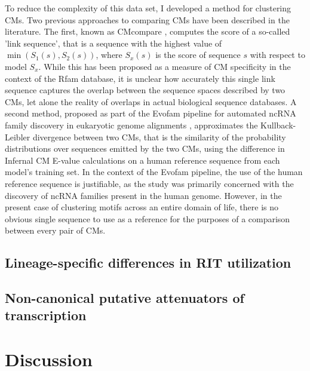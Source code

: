 To reduce the complexity of this data set, I developed a method for clustering CMs. Two previous approaches to comparing CMs have been described in the literature. The first, known as CMcompare \parencite{Honer-zu-Siederdissen2010}, computes the score of a so-called 'link sequence', that is a sequence with the highest value of $\min{(S_1(s), S_2(s))}$, where $S_x(s)$ is the score of sequence $s$ with respect to model $S_x$. While this has been proposed as a measure of CM specificity in the context of the Rfam database, it is unclear how accurately this single link sequence captures the overlap between the sequence spaces described by two CMs, let alone the reality of overlaps in actual biological sequence databases. A second method, proposed as part of the Evofam pipeline for automated ncRNA family discovery in eukaryotic genome alignments \parencite{Parker2011}, approximates the Kullback-Leibler divergence between two CMs, that is the similarity of the probability distributions over sequences emitted by the two CMs, using the difference in Infernal CM E-value calculations on a human reference sequence from each model's training set. In the context of the Evofam pipeline, the use of the human reference sequence is justifiable, as the study was primarily concerned with the discovery of ncRNA families present in the human genome. However, in the present case of clustering motifs across an entire domain of life, there is no obvious single sequence to use as a reference for the purposes of a comparison between every pair of CMs.

\subsection{Lineage-specific differences in RIT utilization}

\subsection{Non-canonical putative attenuators of transcription}

\section{Discussion}